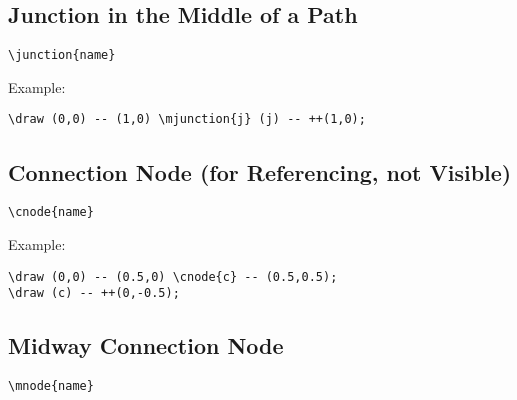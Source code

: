 \documentclass[parskip=full]{scrartcl}
\begin{document}
\subsection{Junction in the Middle of a Path}

\begin{verbatim}
\junction{name}
\end{verbatim}

Example:\\
\begin{minipage}{0.8\textwidth}
\begin{verbatim}
\draw (0,0) -- (1,0) \mjunction{j} (j) -- ++(1,0);
\end{verbatim}
\end{minipage}
\begin{minipage}{0.19\textwidth}
\end{minipage}

\subsection{Connection Node (for Referencing, not Visible)}

\begin{verbatim}
\cnode{name}
\end{verbatim}

Example:\\
\begin{minipage}{0.8\textwidth}
\begin{verbatim}
\draw (0,0) -- (0.5,0) \cnode{c} -- (0.5,0.5);
\draw (c) -- ++(0,-0.5);
\end{verbatim}
\end{minipage}
\begin{minipage}{0.19\textwidth}
\end{minipage}

\subsection{Midway Connection Node}

\begin{verbatim}
\mnode{name}
\end{verbatim}
\end{document}
